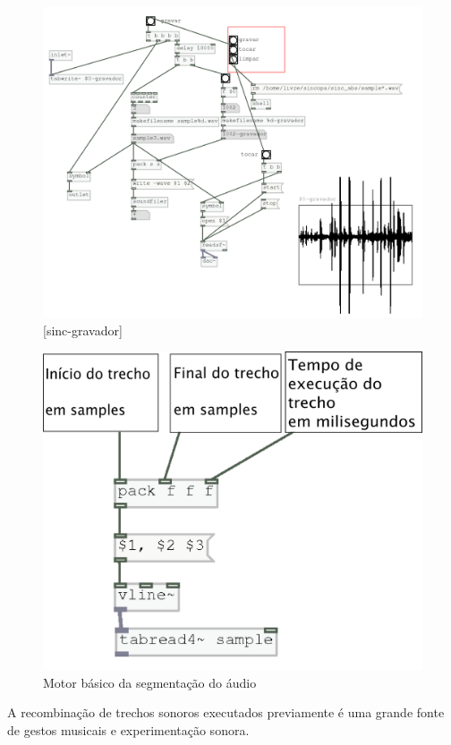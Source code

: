 \documentclass{ppgmus}
\begin{document}
\begin{figure}[-h]
\includegraphics[scale=.6]{sinc-gravador}
\caption{[sinc-gravador]}
\label{sinc-gravador}
\end{figure}

\begin{figure}[-h]
\includegraphics[scale=.6]{slice-motor}
\caption{Motor básico da segmentação do áudio}
\label{slice-motor}
\end{figure}

A recombinação de trechos sonoros executados previamente é uma grande fonte
de gestos musicais e experimentação sonora.
\end{document}
